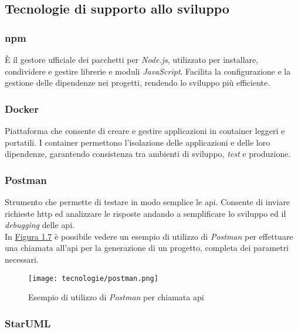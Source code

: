 \pagebreak
\subsection{Tecnologie di supporto allo sviluppo}
\label{sez:tecnologie-supporto-sviluppo}

\subsubsection{\gls{npm}}

È il gestore ufficiale dei pacchetti per \textit{Node.js}, utilizzato per installare, condividere e gestire librerie e moduli \textit{JavaScript}. 
Facilita la configurazione e la gestione delle dipendenze nei progetti, rendendo lo sviluppo più efficiente.

\subsubsection{Docker}

Piattaforma che consente di creare e gestire applicazioni in \gls{container} leggeri e portatili.
I \gls{container} permettono l’isolazione delle applicazioni e delle loro dipendenze, garantendo consistenza tra ambienti di sviluppo, \textit{test} e produzione.

\subsubsection{Postman}

Strumento che permette di testare in modo semplice le \gls{api}. 
Consente di inviare richieste \gls{http} ed analizzare le risposte andando a semplificare lo sviluppo ed il \textit{debugging} delle \gls{api}. \\
In {\hyperref[fig:postman]{Figura 1.7}} è possibile vedere un esempio di utilizzo di \textit{Postman} per effettuare una chiamata all'\gls{api} per
la generazione di un progetto, completa dei parametri necessari.

\begin{figure}[H]
    \label{fig:postman}
    \centering
    \texttt{[image: tecnologie/postman.png]}
    \caption{Esempio di utilizzo di \textit{Postman} per chiamata \gls{api}}
\end{figure}

\subsubsection{StarUML}

